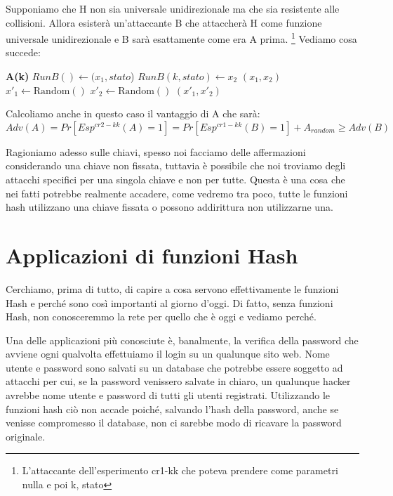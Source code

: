 Supponiamo che H non sia universale unidirezionale ma che sia resistente alle collisioni. Allora esisterà un'attaccante B che attaccherà H come funzione universale unidirezionale e B sarà esattamente come era A prima. \footnote{L'attaccante dell'esperimento cr1-kk che poteva prendere come parametri nulla e poi k, stato} Vediamo cosa succede:
\begin{algorithm}[H]
\caption{Attaccante $A$}
\begin{algorithmic}[1]
\Statex \textbf{A(k)}
\State $Run B() \gets (x_1,stato$) 
\State $Run B(k, stato) \gets x_2$ 
    \State \Return $(x_1, x_2)$
\Else
    \State $x'_1 \gets \text{Random}()$ 
    \State $x'_2 \gets \text{Random}()$ 
    \State \Return $(x'_1, x'_2)$ 
\EndIf
\end{algorithmic}
\end{algorithm}
Calcoliamo anche in questo caso il vantaggio di A che sarà:
\[Adv(A)=Pr[Esp^{cr2-kk}(A)=1]=Pr[Esp^{cr1-kk}(B)=1]+A_{random} \geq Adv(B)\]

Ragioniamo adesso sulle chiavi, spesso noi facciamo delle affermazioni considerando una chiave non fissata, tuttavia è possibile che noi troviamo degli attacchi specifici per una singola chiave e non per tutte. Questa è una cosa che nei fatti potrebbe realmente accadere, come vedremo tra poco, tutte le funzioni hash utilizzano una chiave fissata o possono addirittura non utilizzarne una.

\section{Applicazioni di funzioni Hash}
Cerchiamo, prima di tutto, di capire a cosa servono effettivamente le funzioni Hash e perché sono così importanti al giorno d'oggi. Di fatto, senza funzioni Hash, non conosceremmo la rete per quello che è oggi e vediamo perché. 

Una delle applicazioni più conosciute è, banalmente, la verifica della password che avviene ogni qualvolta effettuiamo il login su un qualunque sito web. Nome utente e password sono salvati su un database che potrebbe essere soggetto ad attacchi per cui, se la password venissero salvate in chiaro, un qualunque hacker avrebbe nome utente e password di tutti gli utenti registrati. Utilizzando le funzioni hash ciò non accade poiché, salvando l'hash della password, anche se venisse compromesso il database, non ci sarebbe modo di ricavare la password originale.

